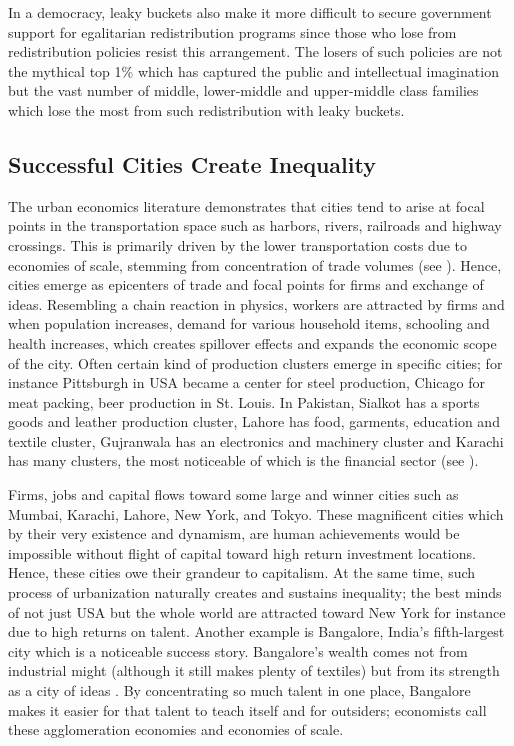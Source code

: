 \documentclass[12pt]{article}
\newcommand{\1}{\mathbbm 1}
\begin{document}
		In a democracy, leaky buckets also make it more difficult to secure government support for egalitarian redistribution programs since those who lose from redistribution policies resist this arrangement. The losers of such policies are not the mythical top 1\% which has captured the public and intellectual imagination but the vast number of middle, lower-middle and upper-middle class families which lose the most from such redistribution with leaky buckets.

		
		
		
		
	
		
		

		
		\subsection{Successful Cities Create Inequality}
		
		
		The urban economics literature demonstrates that cities tend to arise at focal points in the transportation space such as harbors, rivers, railroads and highway crossings. This is primarily driven by the lower transportation costs due to economies of scale, stemming from concentration of trade volumes (see \cite{brueckner2011lectures}). Hence, cities emerge as epicenters of trade and focal points for firms and exchange of ideas. Resembling a chain reaction in physics, workers are attracted by firms and when population increases, demand for various household items, schooling and health increases, which creates spillover effects and expands the economic scope of the city. Often certain kind of production clusters emerge in specific cities; for instance Pittsburgh in USA became a center for steel production, Chicago for meat packing, beer production in St. Louis. In Pakistan, Sialkot has a sports goods and leather production cluster, Lahore has food, garments, education and textile cluster, Gujranwala has an electronics and machinery cluster and Karachi has many clusters, the most noticeable of which is the financial sector (see \cite{azhar2019effects}).
		
		
	 Firms, jobs and capital flows toward some large and winner cities such as Mumbai, Karachi, Lahore, New York, and Tokyo. These magnificent cities which by their very existence and dynamism, are human achievements would be impossible without flight of capital toward high return investment locations. Hence, these cities owe their grandeur to capitalism. At the same time, such process of urbanization naturally creates and sustains inequality; the best minds of not just USA but the whole world are attracted toward New York for instance due to high returns on talent. Another example is Bangalore, India's fifth-largest city which is a noticeable success story. Bangalore's wealth comes not from industrial might (although it still makes plenty of textiles) but from its strength as a city of ideas \cite{glaeser2013triumph}. By concentrating so much talent in one place, Bangalore makes it easier for that talent to teach itself and for outsiders; economists call these agglomeration economies and economies of scale.
		
\end{document}
